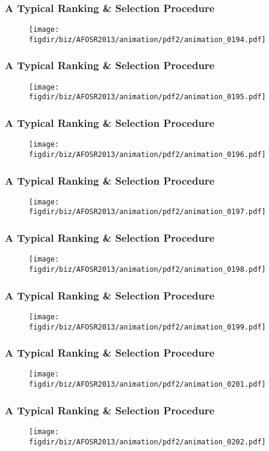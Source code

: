 \documentclass[13pt]{beamer}
\newcommand{\figdir}{../../fig}
\begin{document}
{\begin{frame}\frametitle{A Typical Ranking \& Selection Procedure}\begin{figure}\texttt{[image: \\figdir/biz/AFOSR2013/animation/pdf2/animation\_0194.pdf]}\end{figure}\end{frame}
\begin{frame}\frametitle{A Typical Ranking \& Selection Procedure}\begin{figure}\texttt{[image: \\figdir/biz/AFOSR2013/animation/pdf2/animation\_0195.pdf]}\end{figure}\end{frame}
\begin{frame}\frametitle{A Typical Ranking \& Selection Procedure}\begin{figure}\texttt{[image: \\figdir/biz/AFOSR2013/animation/pdf2/animation\_0196.pdf]}\end{figure}\end{frame}
\begin{frame}\frametitle{A Typical Ranking \& Selection Procedure}\begin{figure}\texttt{[image: \\figdir/biz/AFOSR2013/animation/pdf2/animation\_0197.pdf]}\end{figure}\end{frame}
\begin{frame}\frametitle{A Typical Ranking \& Selection Procedure}\begin{figure}\texttt{[image: \\figdir/biz/AFOSR2013/animation/pdf2/animation\_0198.pdf]}\end{figure}\end{frame}
\begin{frame}\frametitle{A Typical Ranking \& Selection Procedure}\begin{figure}\texttt{[image: \\figdir/biz/AFOSR2013/animation/pdf2/animation\_0199.pdf]}\end{figure}\end{frame}
\begin{frame}\frametitle{A Typical Ranking \& Selection Procedure}\begin{figure}\texttt{[image: \\figdir/biz/AFOSR2013/animation/pdf2/animation\_0201.pdf]}\end{figure}\end{frame}
\begin{frame}\frametitle{A Typical Ranking \& Selection Procedure}\begin{figure}\texttt{[image: \\figdir/biz/AFOSR2013/animation/pdf2/animation\_0202.pdf]}\end{figure}\end{frame}
}
\end{document}
